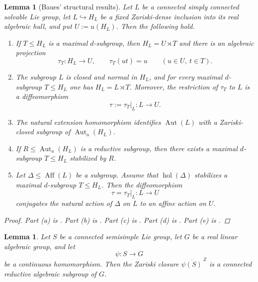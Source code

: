 \documentclass[reqno]{amsart}
\numberwithin{equation}{section}
\newtheorem{lemma}[theorem]{Lemma}
\theoremstyle{definition}
\theoremstyle{remark}
\DeclareMathOperator{\Aut}{Aut}
\DeclareMathOperator{\Aff}{Aff}
\begin{document}
\begin{lemma}[Baues' structural results]\label{lem:baues-input}
Let $L$ be a connected simply connected solvable Lie group, let
$L\hookrightarrow H_L$
be a fixed Zariski-dense inclusion into its real algebraic hull, and put
$U:=u(H_L)$.
Then the following hold.

\begin{enumerate}[label=\textup{(\alph*)}]
\item
If $T\leq H_L$ is a maximal $d$-subgroup, then $H_L=U\rtimes T$
and there is an algebraic projection
\[
\tau_T\colon H_L\longrightarrow U,
\qquad
\tau_T(ut)=u
\qquad (u\in U,\ t\in T).
\]

\item The subgroup $L$ is closed and normal in $H_L$, and for every maximal
$d$-subgroup $T\leq H_L$ one has $H_L=L\rtimes T$.
Moreover, the restriction of $\tau_T$ to $L$ is a diffeomorphism
\[
\tau:=\tau_T|_L\colon L\longrightarrow U.
\]

\item The natural extension homomorphism identifies $\Aut(L)$ with a
Zariski-closed subgroup of $\Aut_a(H_L)$.

\item
If $R\leq \Aut_a(H_L)$ is a reductive subgroup, then there exists a maximal
$d$-subgroup $T\leq H_L$ stabilized by $R$.

\item Let $\Delta\leq \Aff(L)$ be a subgroup. Assume that
$\operatorname{hol}(\Delta)$ stabilizes a maximal $d$-subgroup $T\leq H_L$.
Then the diffeomorphism
\[
\tau=\tau_T|_L\colon L\longrightarrow U
\]
conjugates the natural action of $\Delta$ on $L$ to an affine action on $U$.
\end{enumerate}

\begin{proof}
Part \textup{(a)} is \cite[Proposition~2.1]{Baues}.
Part \textup{(b)} is \cite[Proposition~2.3]{Baues}.
Part \textup{(c)} is \cite[Proposition~2.5]{Baues}.
Part \textup{(d)} is \cite[Lemma~3.7]{Baues}.
Part \textup{(e)} is \cite[Lemma~3.6]{Baues}.
\end{proof}
\end{lemma}

\begin{lemma}\label{lem:semisimple-zariski-reductive}
Let $S$ be a connected semisimple Lie group, let $G$ be a real linear
algebraic group, and let
\[
\psi\colon S\longrightarrow G
\]
be a continuous homomorphism. Then the Zariski closure
$\overline{\psi(S)}^{\,Z}$
is a connected reductive algebraic subgroup of $G$.
\end{lemma}
\end{document}
